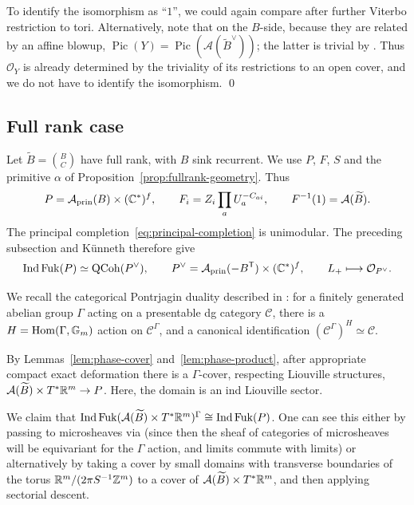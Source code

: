 \documentclass[12pt, letter]{amsart}
\DeclareMathOperator{\Ind}{Ind}
\DeclareMathOperator{\Fuk}{Fuk}
\theoremstyle{definition}
\begin{document}
To identify the isomorphism as ``$1$'', we could again compare after further Viterbo restriction to tori.  Alternatively, note that on the $B$-side, because they are related by an affine blowup, $\operatorname{Pic}(Y) = \operatorname{Pic}(\mathcal{A}(\widetilde B^\vee))$; the latter is trivial by \cite[Thm. 4.13]{Cao-Keller-Qin}.  Thus $\mathcal{O}_Y$ is already determined by the triviality of its restrictions to an open cover, and we do not have to identify the isomorphism. \qed

\subsection{Full rank case}



Let $\widetilde B=\binom BC$ have full rank, with $B$ sink recurrent.
We use $P$, $F$, $S$ and the primitive $\alpha$ of
Proposition~\ref{prop:fullrank-geometry}. Thus
\[
 P=\mathcal{A}_{\mathrm{prin}}(B)\times(\mathbb{C}^*)^f,\qquad
 F_i=Z_i\prod_aU_a^{-C_{ai}},\qquad
 F^{-1}(1)=\mathcal{A}(\widetilde B).
\]
The principal completion~\eqref{eq:principal-completion} is unimodular.
The preceding subsection and K\"unneth therefore give
\begin{equation}\label{eq:fullrank-principal-hms}
 \Ind\Fuk(P)\simeq\QCoh(P^\vee),\qquad
 P^\vee=\cA_{\mathrm{prin}}(-B^{\T})\times(\bC^*)^f,
 \qquad L_+\longmapsto\cO_{P^\vee}.
\end{equation}

We recall the categorical Pontrjagin duality described in \cite[Lemma 8]{Sh21}: for a finitely generated abelian group $\Gamma$ acting on a presentable dg category $\mathcal{C}$, there is a $H = \operatorname{Hom}(\Gamma, \mathbb{G}_m)$ action on $\mathcal{C}^\Gamma$, and a canonical identification
$(\mathcal{C}^\Gamma)^{H} \simeq \mathcal{C}$. 

By Lemmas~\ref{lem:phase-cover} and~\ref{lem:phase-product}, after appropriate compact exact deformation there is a $\Gamma$-cover, respecting Liouville structures, 
$\mathcal{A}(\widetilde B) \times T^*\mathbb{R}^m \to P$.  Here,  the domain is an ind Liouville sector. 


We claim that
$ \Ind \Fuk ( \cA(\widetilde B) \times T^*\bR^m)^\Gamma \cong \Ind \Fuk(P)$.  One can see this either by passing to microsheaves via \cite{GPS3} (since then the sheaf of categories of microsheaves will be equivariant for the $\Gamma$ action, and limits commute with limits) or alternatively by taking a cover by small domains with transverse boundaries of the  torus $\mathbb{R}^m/(2\pi S^{-1}\mathbb{Z}^m)$  to a cover of  $ \mathcal{A}(\widetilde B)  \times T^*\mathbb{R}^m$, and then applying sectorial descent. 
\end{document}
